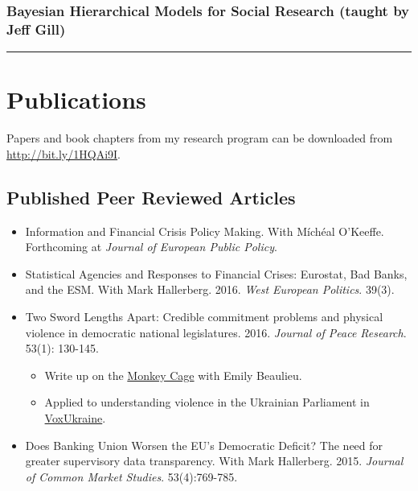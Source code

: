 \documentclass[a4paper]{article}
\begin{document}
{\subsubsection*{Bayesian Hierarchical Models for Social Research (taught by Jeff Gill)}

\vspace{0.25cm}
\medskip\hrule height 1pt
\vspace{0.5cm}


\section*{Publications}

\noindent Papers and book chapters from my research program can be downloaded from {\url{http://bit.ly/1HQAi9I}}.

\subsection*{Published Peer Reviewed Articles}

\begin{itemize}

    \item Information and Financial Crisis Policy Making. With M\'{i}ch\'{e}al O'Keeffe. Forthcoming at \emph{Journal of European Public Policy}.

    \item Statistical Agencies and Responses to Financial Crises: Eurostat, Bad Banks, and the ESM. With Mark Hallerberg. 2016. {\emph{West European Politics}}. 39(3).

    \item Two Sword Lengths Apart: Credible commitment problems and physical violence in democratic national legislatures. 2016. \emph{Journal of Peace Research}. 53(1): 130-145.

        \begin{itemize}
            \item Write up on the \href{http://t.co/fETbFCXcYU}{Monkey Cage} with Emily Beaulieu.

            \item Applied to understanding violence in the Ukrainian Parliament in \href{http://voxukraine.org/2015/12/24/causes-and-possible-solutions-to-brawling-in-the-ukrainian-parliament-en-2/}{VoxUkraine}.
    \end{itemize}

    \item Does Banking Union Worsen the EU's Democratic Deficit? The need for greater supervisory data transparency. With Mark Hallerberg. 2015. {\emph{Journal of Common Market Studies}}. 53(4):769-785.


\end{itemize}}
\end{document}
